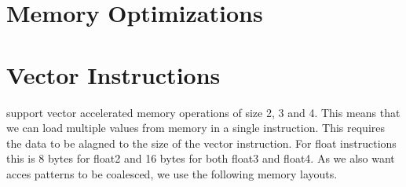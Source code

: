\section{Memory Optimizations}

\section{Vector Instructions}
\cuda support vector accelerated memory operations of size 2, 3 and 4.
This means that we can load multiple values from memory in a single instruction.
This requires the data to be alagned to the size of the vector instruction.
For float instructions this is 8 bytes for float2 and 16 bytes for both float3 and float4.
As we also want acces patterns to be coalesced, we use the following memory layouts.


